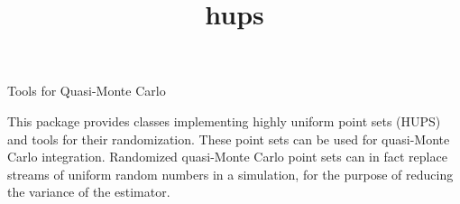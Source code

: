 \documentclass[12pt]{article}
\begin{document}
\begin{titlepage}

\title{hups}{Tools for Quasi-Monte Carlo}

This package provides classes implementing highly uniform point sets
(HUPS) and tools for their randomization.
These point sets can be used for quasi-Monte Carlo integration.
Randomized quasi-Monte Carlo point sets can in fact replace streams
of uniform random numbers in a simulation, for the purpose of
reducing the variance of the estimator.

\vfill
\end{titlepage}


\tableofcontents
{}





% 









% 





































\end{document}
